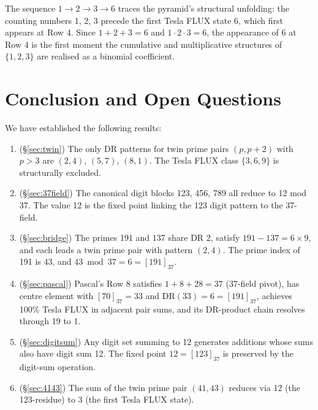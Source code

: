 \documentclass[12pt]{article}
\begin{document}
The sequence $1\to 2\to 3\to 6$ traces the pyramid's structural unfolding:
the counting numbers 1, 2, 3 precede the first Tesla FLUX state 6, which
first appears at Row 4.  Since $1+2+3=6$ and $1\cdot2\cdot3=6$, the
appearance of 6 at Row 4 is the first moment the cumulative and
multiplicative structures of $\{1,2,3\}$ are realised as a binomial coefficient.

\section{Conclusion and Open Questions}
\label{sec:conclusion}

We have established the following results:

\begin{enumerate}
\item (\S\ref{sec:twin}) The only DR patterns for twin prime pairs $(p,p+2)$
with $p>3$ are $(2,4)$, $(5,7)$, $(8,1)$.  The Tesla FLUX class $\{3,6,9\}$
is structurally excluded.

\item (\S\ref{sec:37field}) The canonical digit blocks 123, 456, 789 all
reduce to 12 mod 37.  The value 12 is the fixed point linking the 123
digit pattern to the 37-field.

\item (\S\ref{sec:bridge}) The primes 191 and 137 share DR 2, satisfy
$191-137=6\times 9$, and each leads a twin prime pair with pattern $(2,4)$.
The prime index of 191 is 43, and $43\bmod 37 = 6 = [191]_{37}$.

\item (\S\ref{sec:pascal}) Pascal's Row 8 satisfies $1+8+28=37$ (37-field
pivot), has centre element with $[70]_{37}=33$ and $\mathrm{DR}(33)=6=[191]_{37}$,
achieves 100\% Tesla FLUX in adjacent pair sums, and its DR-product chain
resolves through 19 to 1.

\item (\S\ref{sec:digitsum}) Any digit set summing to 12 generates additions
whose sums also have digit sum 12.  The fixed point $12=[123]_{37}$ is
preserved by the digit-sum operation.

\item (\S\ref{sec:4143}) The sum of the twin prime pair $(41,43)$ reduces
via 12 (the 123-residue) to 3 (the first Tesla FLUX state).
\end{enumerate}
\end{document}
